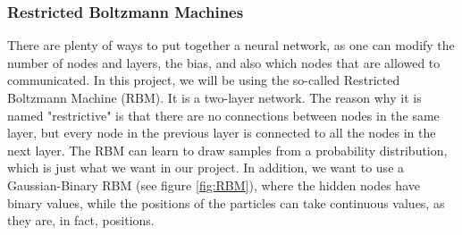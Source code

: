 \documentclass[norsk,a4paper,12pt]{article}
\begin{document}
\subsubsection{Restricted Boltzmann Machines} \label{sec:RBM}
There are plenty of ways to put together a neural network, as one can modify the number of nodes and layers, the bias, and also which nodes that are allowed to communicated. In this project, we will be using the so-called Restricted Boltzmann Machine (RBM). It is a two-layer network. The reason why it is named "restrictive" is that there are no connections between nodes in the same layer, but every node in the previous layer is connected to all the nodes in the next layer. The RBM can learn to draw samples from a probability distribution, which is just what we want in our project. In addition, we want to use a Gaussian-Binary RBM (see figure \ref{fig:RBM}), where the hidden nodes have binary values, while the positions of the particles can take continuous values, as they are, in fact, positions. 
\end{document}
